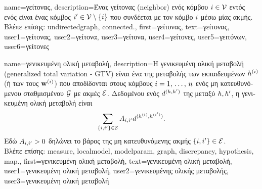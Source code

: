 {name={\foreignlanguage{greek}{γείτονας}},
	description={\foreignlanguage{greek}{Ένας γείτονας} (neighbor) \foreignlanguage{greek}{ενός 
		κόμβου} 
		$i \in \mathcal{V}$ \foreignlanguage{greek}{εντός ενός}  
		\foreignlanguage{greek}{είναι ένας κόμβος $i' \in \mathcal{V} \setminus \{ i\}$ 
		που συνδέεται με τον κόμβο $i$ μέσω μίας ακμής}.
		\\
		\foreignlanguage{greek}{Βλέπε επίσης:} \gls{undirectedgraph}, \gls{connected}.},
	first={\foreignlanguage{greek}{γεί\-τονας}},
	text={\foreignlanguage{greek}{γεί\-τονας}},
	user1={\foreignlanguage{greek}{γείτονας}}, %
   	user2={\foreignlanguage{greek}{γείτονα}}, %
	user3={\foreignlanguage{greek}{γείτονα}}, %
	user4={\foreignlanguage{greek}{γείτονες}}, %
   	user5={\foreignlanguage{greek}{γειτόνων}}, %
	user6={\foreignlanguage{greek}{γείτονες}} %
}

{name={\foreignlanguage{greek}{γενικευμένη ολική μεταβολή}}, 
	description={\foreignlanguage{greek}{Η γενικευμένη ολική μεταβολή} (generalized total variation - GTV) \foreignlanguage{greek}{είναι 
		ένα}  \foreignlanguage{greek}{της μεταβολής των 
		εκπαιδευμένων} 
		 $h^{(i)}$ (\foreignlanguage{greek}{ή των}  
		\foreignlanguage{greek}{τους} $\mathbf{w}^{(i)}$) \foreignlanguage{greek}{που αποδίδονται στους κόμβους 
		$i=1, \,\ldots, \,n$ ενός μη κατευθυνόμενου σταθμισμένου}  $\mathcal{G}$ 
		\foreignlanguage{greek}{με ακμές $\mathcal{E}$. Δεδομένου ενός}  $d^{(h,h')}$ 
		\foreignlanguage{greek}{της}  \foreignlanguage{greek}{μεταξύ}  
		 $h,h'$, \foreignlanguage{greek}{η γενικευμένη ολική μεταβολή είναι}
		\begin{equation} 
			\nonumber
			\sum_{\{i,i'\}\in \mathcal{E}} A_{i,i'} 
			d^{(h^{(i)},h^{(i')})}.
		\end{equation}
		\foreignlanguage{greek}{Εδώ $A_{i,i'}>0$ δηλώνει το βάρος της μη κατευθυνόμενης ακμής} 
		$\{i,i'\}\in \mathcal{E}$. 
		\\
		\foreignlanguage{greek}{Βλέπε επίσης:} \gls{measure}, \gls{localmodel}, \gls{modelparam}, \gls{graph}, \gls{discrepancy}, 
		\gls{hypothesis}, \gls{map}.},
	first={\foreignlanguage{greek}{γενικευμένη ολική μεταβολή}},
	text={\foreignlanguage{greek}{γενικευμένη ολική μεταβολή}},
	user1={\foreignlanguage{greek}{γενικευμένη ολική μεταβολή}}, %
  	user2={\foreignlanguage{greek}{γενικευμένης ολικής μεταβολής}}, %
	user3={\foreignlanguage{greek}{γενικευμένη ολική μεταβολή}} %
}

